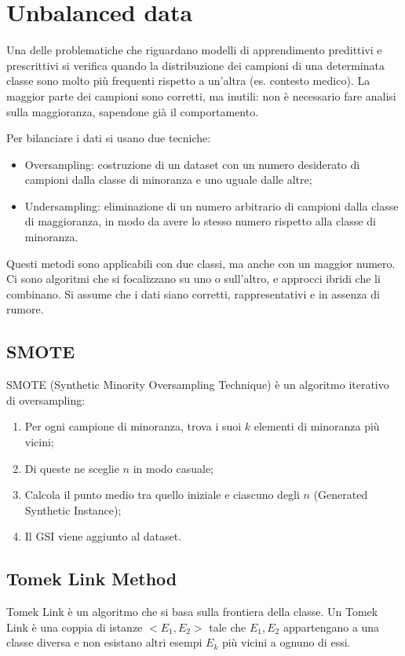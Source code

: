 \section{Unbalanced data}
Una delle problematiche che riguardano modelli di apprendimento predittivi e prescrittivi si verifica quando la distribuzione dei campioni di una determinata classe sono molto più frequenti rispetto a un'altra (es. contesto medico). La maggior parte dei campioni sono corretti, ma inutili: non è necessario fare analisi sulla maggioranza, sapendone già il comportamento. 

Per bilanciare i dati si usano due tecniche:
\begin{itemize}
	\item Oversampling: costruzione di un dataset con un numero desiderato di campioni dalla classe di minoranza e uno uguale dalle altre;
	\item Undersampling: eliminazione di un numero arbitrario di campioni dalla classe di maggioranza, in modo da avere lo stesso numero rispetto alla classe di minoranza. 
\end{itemize}
Questi metodi sono applicabili con due classi, ma anche con un maggior numero. Ci sono algoritmi che si focalizzano su uno o sull'altro, e approcci ibridi che li combinano. Si assume che i dati siano corretti, rappresentativi e in assenza di rumore.

\subsection{SMOTE}
SMOTE (Synthetic Minority Oversampling Technique) è un algoritmo iterativo di oversampling:
\begin{enumerate}
	\item Per ogni campione di minoranza, trova i suoi $k$ elementi di minoranza più vicini;
	\item Di queste ne sceglie $n$ in modo casuale;
	\item Calcola il punto medio tra quello iniziale e ciascuno degli $n$ (Generated Synthetic Instance);
	\item Il GSI viene aggiunto al dataset.
\end{enumerate}

\subsection{Tomek Link Method}
Tomek Link è un algoritmo che si basa sulla frontiera della classe. Un Tomek Link è una coppia di istanze $<E_1, E_2>$ tale che $E_1, E_2$ appartengano a una classe diversa e non esistano altri esempi $E_k$ più vicini a ognuno di essi.

